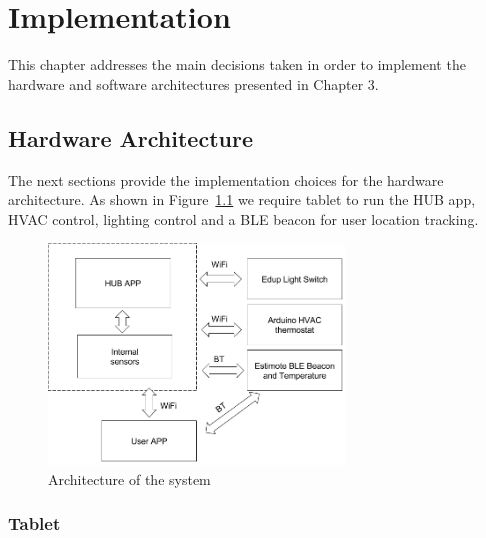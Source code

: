 \chapter{Implementation}
\label{chapter:implementation}

This chapter addresses the main decisions taken in order to implement the hardware and software architectures presented in Chapter 3.


\section{Hardware Architecture}


The next sections provide the implementation choices for the hardware architecture. As shown in Figure~\ref{architecture_system} we require tablet to run the HUB app, HVAC control, lighting control and a \ac{BLE} beacon for user location tracking.



\begin{figure}[h]
\centering
\includegraphics[width=0.7\textwidth]{Figures/top_view}
\caption{Architecture of the system}
\label{architecture_system}
\end{figure}






\subsection{Tablet}

